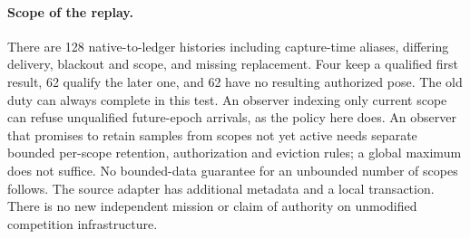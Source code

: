 \documentclass{article}
\begin{document}
\paragraph{Scope of the replay.}
There are 128 native-to-ledger histories including capture-time
aliases, differing delivery, blackout and scope, and missing
replacement. Four keep a qualified first result, 62 qualify the
later one, and 62 have no resulting authorized pose. The old duty
can always complete in this test. An observer indexing only current
scope can refuse unqualified future-epoch arrivals, as the policy
here does. An observer that promises to retain samples from scopes
not yet active needs separate bounded per-scope retention,
authorization and eviction rules; a global maximum does not suffice.
No bounded-data guarantee for an unbounded number of scopes follows.
The source adapter has additional metadata and a local transaction.
There is no new independent mission or claim of authority on
unmodified competition infrastructure.
\end{document}
